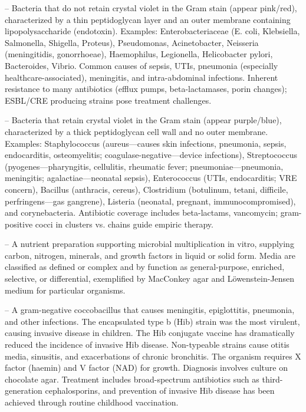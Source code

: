 -- Bacteria that do not retain crystal violet in the Gram stain (appear pink/red), characterized by a thin peptidoglycan layer and an outer membrane containing lipopolysaccharide (endotoxin). Examples: Enterobacteriaceae (E. coli, Klebsiella, Salmonella, Shigella, Proteus), Pseudomonas, Acinetobacter, Neisseria (meningitidis, gonorrhoeae), Haemophilus, Legionella, Helicobacter pylori, Bacteroides, Vibrio. Common causes of sepsis, UTIs, pneumonia (especially healthcare-associated), meningitis, and intra-abdominal infections. Inherent resistance to many antibiotics (efflux pumps, beta-lactamases, porin changes); ESBL/CRE producing strains pose treatment challenges.

-- Bacteria that retain crystal violet in the Gram stain (appear purple/blue), characterized by a thick peptidoglycan cell wall and no outer membrane. Examples: Staphylococcus (aureus—causes skin infections, pneumonia, sepsis, endocarditis, osteomyelitis; coagulase-negative—device infections), Streptococcus (pyogenes—pharyngitis, cellulitis, rheumatic fever; pneumoniae—pneumonia, meningitis; agalactiae—neonatal sepsis), Enterococcus (UTIs, endocarditis; VRE concern), Bacillus (anthracis, cereus), Clostridium (botulinum, tetani, difficile, perfringens—gas gangrene), Listeria (neonatal, pregnant, immunocompromised), and corynebacteria. Antibiotic coverage includes beta-lactams, vancomycin; gram-positive cocci in clusters vs. chains guide empiric therapy.

-- A nutrient preparation supporting microbial multiplication in vitro, supplying carbon, nitrogen, minerals, and growth factors in liquid or solid form. Media are classified as defined or complex and by function as general-purpose, enriched, selective, or differential, exemplified by MacConkey agar and Löwenstein-Jensen medium for particular organisms.

-- A gram-negative coccobacillus that causes meningitis, epiglottitis, pneumonia, and other infections. The encapsulated type b (Hib) strain was the most virulent, causing invasive disease in children. The Hib conjugate vaccine has dramatically reduced the incidence of invasive Hib disease. Non-typeable strains cause otitis media, sinusitis, and exacerbations of chronic bronchitis. The organism requires X factor (haemin) and V factor (NAD) for growth. Diagnosis involves culture on chocolate agar. Treatment includes broad-spectrum antibiotics such as third-generation cephalosporins, and prevention of invasive Hib disease has been achieved through routine childhood vaccination.

